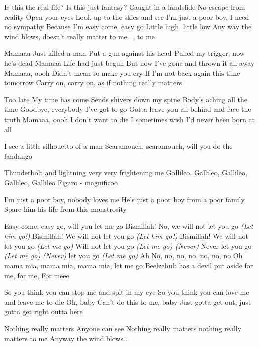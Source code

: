\begin{verse*}
Is this the real life?
Is this just fantasy?
Caught in a landslide
No escape from reality
Open your eyes
Look up to the skies and see
I'm just a poor boy, I need no sympathy
Because I'm easy come, easy go
Little high, little low
Any way the wind blows, doesn't really matter to me..., to me
\end{verse*}

\begin{verse*}
Mamaaa
Just killed a man
Put a gun against his head
Pulled my trigger, now he's dead
Mamaaa
Life had just begun
But now I've gone and thrown it all away
Mamaaa, oooh
Didn't mean to make you cry
If I'm not back again this time tomorrow
Carry on, carry on, as if nothing really matters
\end{verse*}

\begin{verse*}
Too late
My time has come
Sends shivers down my spine
Body's aching all the time
Goodbye, everybody
I've got to go
Gotta leave you all behind and face the truth
Mamaaa, oooh
I don't want to die
I sometimes wish I'd never been born at all
\end{verse*}

\begin{verse*}
I see a little silhouetto of a man
Scaramouch, scaramouch, will you do the fandango
\end{verse*}

\begin{verse*}
Thunderbolt and lightning
very very frightening me
Gallileo, Gallileo,
Gallileo, Gallileo,
Gallileo Figaro - magnificoo
\end{verse*}

\begin{verse*}
I'm just a poor boy, nobody loves me
He's just a poor boy from a poor family
Spare him his life from this monstrosity
\end{verse*}

\begin{verse*}
Easy come, easy go, will you let me go
Bismillah! No, we will not let you go
\textit{(Let him go!)} Bismillah! We will not let you go
\textit{(Let him go!)} Bismillah! We will not let you go
\textit{(Let me go)} Will not let you go
\textit{(Let me go)} \textit{(Never)} Never let you go
\textit{(Let me go)} \textit{(Never)} let you go \textit{(Let me go)} Ah
No, no, no, no, no, no, no
Oh mama mia, mama mia, mama mia, let me go
Beelzebub has a devil put aside for me, for me,
For meee
\end{verse*}

\begin{verse*}
So you think you can stop me and spit in my eye
So you think you can love me and leave me to die
Oh, baby
Can't do this to me, baby
Just gotta get out, just gotta get right outta here
\end{verse*}

\begin{verse*}
Nothing really matters
Anyone can see
Nothing really matters
nothing really matters to me
Anyway the wind blows...
\end{verse*}
